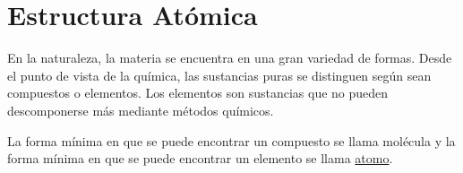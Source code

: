 \chapter{Estructura At\'omica}

En la naturaleza, la materia se encuentra en una gran variedad de formas. Desde el punto de vista de la qu\'imica, las sustancias puras se distinguen seg\'un sean compuestos o elementos. Los elementos son sustancias que no pueden descomponerse m\'as mediante métodos qu\'imicos.

La forma m\'inima en que se puede encontrar un compuesto se llama mol\'ecula y la forma m\'inima en que se puede encontrar un elemento se llama \ul{atomo}.

